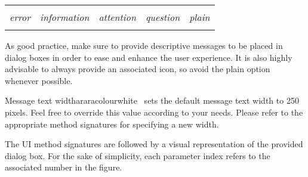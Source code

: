 \vspace{1em}

{\centering
\begin{tabularx}{0.8\textwidth}{YYYYY}
 &
 &
 &
 &
 \\
{\footnotesize\emph{error}} &
{\footnotesize\emph{information}} &
{\footnotesize\emph{attention}} &
{\footnotesize\emph{question}} &
{\footnotesize\emph{plain}} \\
 &
 &
 &
 &
\end{tabularx}\par}

\vspace{1.4em}

As good practice, make sure to provide descriptive messages to be placed in dialog boxes in order to ease and enhance the user experience. It is also highly advisable to always provide an associated icon, so avoid the plain option whenever possible.

\begin{messagebox}{Message text width}{araracolour}{\icok}{white}
\arara\ sets the default message text width to 250 pixels. Feel free to override this value according to your needs. Please refer to the appropriate method signatures for specifying a new width.
\end{messagebox}

The UI method signatures are followed by a visual representation of the provided dialog box. For the sake of simplicity, each parameter index refers to the associated number in the figure.

